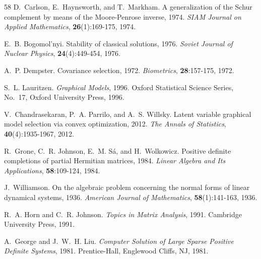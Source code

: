 \documentclass[11pt]{article}
\numberwithin{equation}{section}
\theoremstyle{thmcompact}
\theoremstyle{remark}
\begin{document}
\begin{thebibliography}{58}
{D.~Carlson}, {E.~Haynsworth}, and {T.~Markham}.
\newblock A generalization of the {S}chur complement by means of the
  {M}oore-{P}enrose inverse, 1974.
\newblock \emph{SIAM Journal on Applied Mathematics}, \textbf{26}(1):169-175,
  1974.

{E.~B. Bogomol'nyi}.
\newblock Stability of classical solutions, 1976.
\newblock \emph{Soviet Journal of Nuclear Physics}, \textbf{24}(4):449-454,
  1976.

{A.~P. Dempster}.
\newblock Covariance selection, 1972.
\newblock \emph{Biometrics}, \textbf{28}:157-175, 1972.

{S.~L. Lauritzen}.
\newblock \emph{Graphical Models}, 1996.
\newblock Oxford Statistical Science Series, No.~17, Oxford University Press,
  1996.

{V.~Chandrasekaran}, {P.~A. Parrilo}, and {A.~S. Willsky}.
\newblock Latent variable graphical model selection via convex optimization,
  2012.
\newblock \emph{The Annals of Statistics}, \textbf{40}(4):1935-1967, 2012.

{R.~Grone}, {C.~R. Johnson}, {E.~M. S{\'a}}, and {H.~Wolkowicz}.
\newblock Positive definite completions of partial {H}ermitian matrices, 1984.
\newblock \emph{Linear Algebra and Its Applications}, \textbf{58}:109-124,
  1984.

{J.~Williamson}.
\newblock On the algebraic problem concerning the normal forms of linear
  dynamical systems, 1936.
\newblock \emph{American Journal of Mathematics}, \textbf{58}(1):141-163,
  1936.

{R.~A. Horn} and {C.~R. Johnson}.
\newblock \emph{Topics in Matrix Analysis}, 1991.
\newblock Cambridge University Press, 1991.

{A.~George} and {J.~W.~H. Liu}.
\newblock \emph{Computer Solution of Large Sparse Positive Definite Systems},
  1981.
\newblock Prentice-Hall, Englewood Cliffs, NJ, 1981.


\end{thebibliography}
\end{document}
